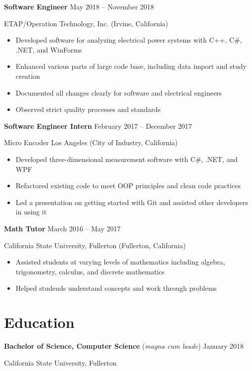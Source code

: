 \documentclass[10pt]{article}
\newcommand{\titleheader}[2]{\textbf{#1} \hfill #2}
\newcommand{\titleextraheader}[3]{\textbf{#1} (#3) \hfill #2}
\newcommand{\locheader}[2]{#1 (#2)}
\newcommand{\instheader}[1]{#1}
\begin{document}
	\titleheader{Software Engineer}{May 2018 -- November 2018}

	\locheader{ETAP/Operation Technology, Inc.}{Irvine, California}

	\begin{itemize}
		\item Developed software for analyzing electrical power systems with C++, C\#, .NET, and WinForms
		\item Enhanced various parts of large code base, including data import and study creation
		\item Documented all changes clearly for software and electrical engineers
		\item Observed strict quality processes and standards
	\end{itemize}

	\titleheader{Software Engineer Intern}{February 2017 -- December 2017}

	\locheader{Micro Encoder Los Angeles}{City of Industry, California}

	\begin{itemize}
		\item Developed three-dimensional measurement software with C\#, .NET, and WPF
		\item Refactored existing code to meet OOP principles and clean code practices
		\item Led a presentation on getting started with Git and assisted other developers in using it
	\end{itemize}

	\titleheader{Math Tutor}{March 2016 -- May 2017}

	\locheader{California State University, Fullerton}{Fullerton, California}

	\begin{itemize}
		\item Assisted students at varying levels of mathematics including algebra, trigonometry, calculus, and discrete mathematics
		\item Helped studends understand concepts and work through problems
	\end{itemize}

	\section*{Education}

	\titleextraheader{Bachelor of Science, Computer Science}{January 2018}{\textit{magna cum laude}}

	\instheader{California State University, Fullerton}
\end{document}
